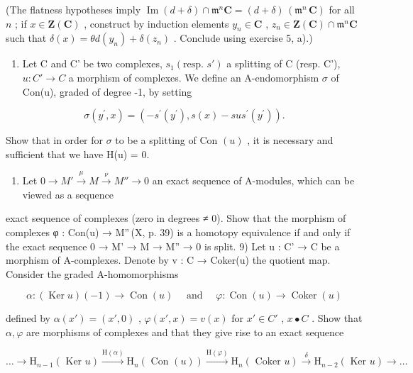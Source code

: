 (The flatness hypotheses imply \(\operatorname{Im}(d + \delta) \cap \mathfrak{m}^n\mathbf{C} = (d + \delta)\, (\mathfrak{m}^n\,\mathbf{C})\) for all \(n\) ; if \(x \in \mathbf{Z}(\mathbf{C})\) , construct by induction elements \(y_n \in \mathbf{C}\) , \(z_n \in \mathbf{Z}(\mathbf{C}) \cap \mathfrak{m}^n\mathbf{C}\) such that \(\delta(x) = \theta d(y_n) + \delta(z_n)\) . Conclude using exercise 5, a).)

\begin{enumerate}
\def\labelenumi{\arabic{enumi})}
\setcounter{enumi}{6}
\tightlist
\item
  Let C and C' be two complexes, \(s_{1}(\text{resp. } s')\) a splitting of C (resp. C'), \(u : C' \to C\) a morphism of complexes. We define an A-endomorphism \(\sigma\) of Con(u), graded of degree -1, by setting
\end{enumerate}

\[
\sigma (y ^ {\prime}, x) = \left(- s ^ {\prime} (y ^ {\prime}), s (x) - s u s ^ {\prime} (y ^ {\prime})\right).
\]

Show that in order for \(\sigma\) to be a splitting of Con \((u)\) , it is necessary and sufficient that we have H(u) = 0.

\begin{enumerate}
\def\labelenumi{\arabic{enumi})}
\setcounter{enumi}{7}
\tightlist
\item
  Let \(0 \to M' \xrightarrow{\mu} M \xrightarrow{\nu} M'' \to 0\) an exact sequence of A-modules, which can be viewed as a sequence
\end{enumerate}

exact sequence of complexes (zero in degrees ≠ 0). Show that the morphism of complexes φ : Con(u) → M''\,(X, p. 39) is a homotopy equivalence if and only if the exact sequence 0 → M' → M → M'' → 0 is split. 9) Let u : C' → C be a morphism of A-complexes. Denote by v : C → Coker(u) the quotient map. Consider the graded A-homomorphisms

\[
\alpha : (\operatorname{Ker} u) (- 1) \rightarrow \operatorname{Con} (u) \quad \text { and } \quad \varphi : \operatorname{Con} (u) \rightarrow \operatorname{Coker} (u)
\]

defined by \(\alpha(x') = (x', 0)\) , \(\varphi(x', x) = v(x)\) for \(x' \in C'\) , \(x \bullet C\) . Show that \(\alpha, \varphi\) are morphisms of complexes and that they give rise to an exact sequence

\[
\dots \rightarrow \mathrm{H} _ {n - 1} (\text { Ker } u) \xrightarrow {\mathrm{H} (\alpha)} \mathrm{H} _ {n} (\text { Con } (u)) \xrightarrow {\mathrm{H} (\varphi)} \mathrm{H} _ {n} (\text { Coker } u) \xrightarrow {\delta} \mathrm{H} _ {n - 2} (\text { Ker } u) \rightarrow \dots
\]


